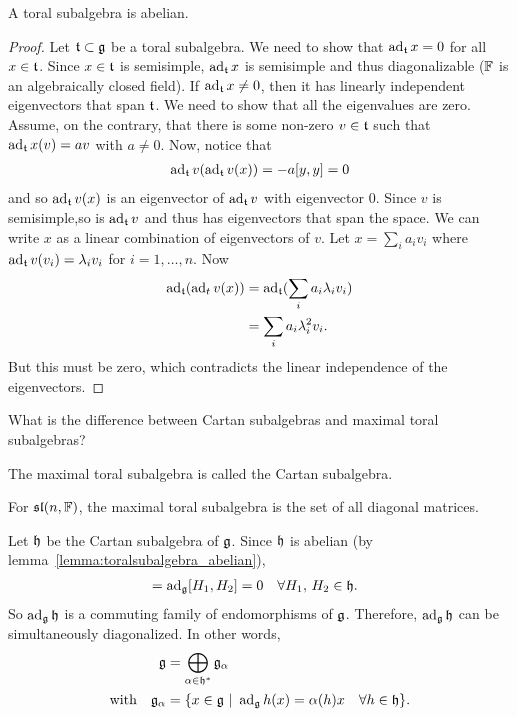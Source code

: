 \begin{lemma}
    A toral subalgebra is abelian.
    \label{lemma:toralsubalgebra_abelian}
\end{lemma}
\begin{proof}
    Let $\Lie t \subset \Lie g$ be a toral subalgebra. We need to show that $\ad_{\Lie t} x=0 $ for all $x\in \Lie t$. Since $x\in \Lie t$ is semisimple, $\ad_\Lie t x$ is semisimple and thus diagonalizable ($\mathbb{F}$ is an algebraically closed field). If $\ad_\Lie t x \neq 0$, then it has linearly independent eigenvectors that span $\Lie t$. We need to show that all the eigenvalues are zero. Assume, on the contrary, that there is some non-zero $v\in \Lie t$ such that $\ad_\Lie t x (v)=av$ with $a\neq 0$. Now, notice that 
    \begin{align}
        \ad_\Lie t v(\ad_\Lie t v(x))=-a[y,y]=0
    \end{align} 
    and so $\ad_\Lie t v(x)$ is an eigenvector of $\ad_\Lie t v$ with eigenvector $0$. Since $v$ is semisimple,so is $\ad_\Lie t v$ and thus has eigenvectors that span the space. We can write $x$ as a linear combination of eigenvectors of $v$. Let $x=\sum_i a_i v_i$ where $\ad_\Lie t v (v_i)=\lambda_i v_i$ for $i=1,\dotsc,n$. Now
    \begin{align}
        \ad_\Lie t (\ad_t v(x))&= \ad_\Lie t (\sum_i a_i \lambda_i v_i) \\
            &= \sum_i a_i \lambda_i^2 v_i. 
    \end{align}
    But this must be zero, which contradicts the linear independence of the eigenvectors.  
\end{proof}

\begin{insight}
    What is the difference between Cartan subalgebras and maximal toral subalgebras?  
\end{insight}

\begin{definition}
    The maximal toral subalgebra  is called the Cartan subalgebra.
\end{definition}

\begin{insight}
   For $\Lie {sl}(n,\FF)$, the maximal toral subalgebra is the set of all diagonal matrices.
\end{insight}
Let $\mathfrak{h}$ be the Cartan subalgebra of $\mathfrak{g}$. Since $\mathfrak{h}$ is abelian (by lemma~\ref{lemma:toralsubalgebra_abelian}), 
\begin{align}
    [\ad_\Lie g H_1, \ad_\Lie g H_2] &= \ad_\Lie g [H_1, H_2] =0  \quad \forall H_1,\, H_2 \in \LieH.
\end{align}
So $\ad_\Lie g \Lie h$ is a commuting family of endomorphisms of $\mathfrak{g}$. Therefore, $\operatorname{ad}_{\mathfrak{g}}\mathfrak{h}$ can be simultaneously diagonalized. In other words,
\begin{align}
    \mathfrak{g} &= \bigoplus_{\alpha\in \mathfrak{h}^*} \mathfrak{g}_\alpha \\
    \text{with}\quad \mathfrak{g}_\alpha &= \{x\in \mathfrak{g}\ |\ \operatorname{ad}_{\mathfrak{g}} h (x)=\alpha(h)x \quad\forall h\in \mathfrak{h}\}.
\end{align}

